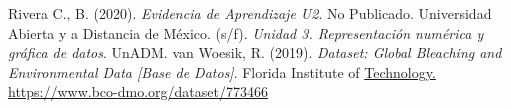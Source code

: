 \documentclass[12pt]{article}
\begin{document}

\begin{thebibliography}{X}
	 Rivera C., B. (2020). \textit{Evidencia de Aprendizaje U2}. No Publicado.
	 Universidad Abierta y a Distancia de México. (s/f). \textit{Unidad 3. Representación numérica y gráfica de datos}. UnADM.
	 van Woesik, R. (2019). \textit{Dataset: Global Bleaching and Environmental Data [Base de Datos]}. Florida Institute of \url{Technology. https://www.bco-dmo.org/dataset/773466}
 
\end{thebibliography}
\end{document}
